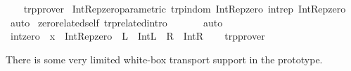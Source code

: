 \begin{isabellebody}
%
\isadelimproof
\ \ %
\endisadelimproof
%
\isatagproof
{}\isamarkupfalse%
\ trp{\isacharunderscore}{\kern0pt}prover%
\endisatagproof
{\isafoldproof}%
%
\isadelimproof
%
\endisadelimproof
%
\isadelimdocument
%
\endisadelimdocument
%
\isatagdocument
%
\isamarkuptrue%
%
\endisatagdocument
{\isafolddocument}%
%
\isadelimdocument
%
\endisadelimdocument
{}\isamarkupfalse%
\ Int{\isacharunderscore}{\kern0pt}Rep{\isacharunderscore}{\kern0pt}zero{\isacharunderscore}{\kern0pt}parametric\ {\isacharbrackleft}{\kern0pt}trp{\isacharunderscore}{\kern0pt}in{\isacharunderscore}{\kern0pt}dom{\isacharbrackright}{\kern0pt}{\isacharcolon}{\kern0pt}\ {\isachardoublequoteopen}Int{\isacharunderscore}{\kern0pt}Rep{\isacharunderscore}{\kern0pt}zero\ {\isacharequal}{\kern0pt}\isactrlbsub int{\isacharunderscore}{\kern0pt}rep\isactrlesub \ Int{\isacharunderscore}{\kern0pt}Rep{\isacharunderscore}{\kern0pt}zero{\isachardoublequoteclose}\isanewline
%
\isadelimproof
\ \ %
\endisadelimproof
%
\isatagproof
{}\isamarkupfalse%
\ auto%
\endisatagproof
{\isafoldproof}%
%
\isadelimproof
\isanewline
%
\endisadelimproof
\isanewline
{}\isamarkupfalse%
\ zero{\isacharunderscore}{\kern0pt}related{\isacharunderscore}{\kern0pt}self\ {\isacharbrackleft}{\kern0pt}trp{\isacharunderscore}{\kern0pt}related{\isacharunderscore}{\kern0pt}intro{\isacharbrackright}{\kern0pt}{\isacharcolon}{\kern0pt}\ {\isachardoublequoteopen}{}\ {\isacharequal}{\kern0pt}\isactrlbsub {\isasymnat}\isactrlesub \ {}{\isachardoublequoteclose}\isanewline
%
\isadelimproof
\ \ %
\endisadelimproof
%
\isatagproof
{}\isamarkupfalse%
\ auto%
\endisatagproof
{\isafoldproof}%
%
\isadelimproof
\isanewline
%
\endisadelimproof
\isanewline
{}\isamarkupfalse%
\ int{\isacharunderscore}{\kern0pt}zero\ \ x\ {\isacharequal}{\kern0pt}\ Int{\isacharunderscore}{\kern0pt}Rep{\isacharunderscore}{\kern0pt}zero\ \ L\ {\isacharequal}{\kern0pt}\ Int{\isachardot}{\kern0pt}L\ \ R\ {\isacharequal}{\kern0pt}\ Int{\isachardot}{\kern0pt}R\isanewline
%
\isadelimproof
\ \ %
\endisadelimproof
%
\isatagproof
{}\isamarkupfalse%
\ trp{\isacharunderscore}{\kern0pt}prover%
\endisatagproof
{\isafoldproof}%
%
\isadelimproof
%
\endisadelimproof
%
\begin{isamarkuptext}%
There is some very limited white-box transport support in the prototype.%
\end{isamarkuptext}\isamarkuptrue%

\end{isabellebody}
